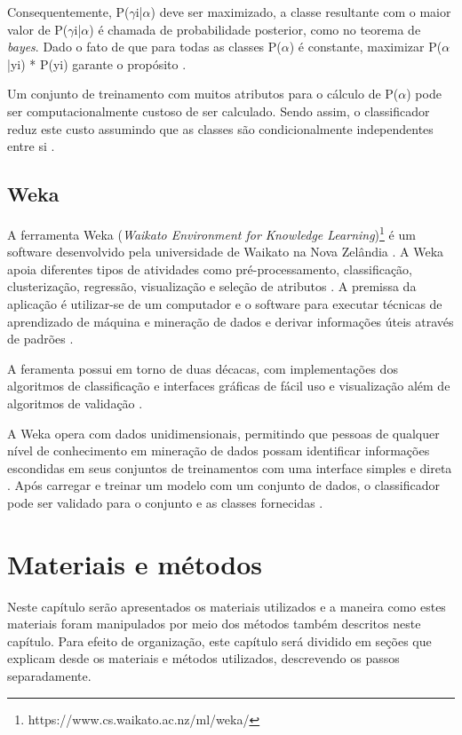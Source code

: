 \documentclass[
	12pt,				%
	oneside,			%
	a4paper,			%
	english,			%
	brazil				%
	]{abntex2ppgsi}
\begin{document}
Consequentemente, P($\gamma$i|$\alpha$)  deve ser maximizado, a classe resultante com o maior valor de P($\gamma$i|$\alpha$)  é chamada de probabilidade posterior, como no teorema de \textit{bayes}. Dado o fato de que para todas as classes P($\alpha$) é constante, maximizar P($\alpha$|yi) * P(yi) garante o propósito \cite{ sharma2015}.

Um conjunto de treinamento com muitos atributos para o cálculo de P($\alpha$) pode ser computacionalmente custoso de ser calculado. Sendo assim, o classificador reduz este custo assumindo que as classes são condicionalmente independentes entre si \cite{ sharma2015}.


\section{Weka}
A ferramenta Weka (\textit{Waikato Environment for Knowledge Learning})\footnote{https://www.cs.waikato.ac.nz/ml/weka/} é um software desenvolvido pela universidade de Waikato na Nova Zelândia \cite{Subbulakshmi2012}.  A Weka apoia diferentes tipos de atividades como pré-processamento, classificação, clusterização, regressão, visualização e seleção de atributos \cite{Subbulakshmi2012}. A premissa da aplicação é utilizar-se de um computador e o software para executar técnicas de aprendizado de máquina e mineração de dados e derivar informações úteis através de padrões \cite{Subbulakshmi2012}.

A feramenta possui em torno de duas décacas, com  implementações dos algoritmos de classificação e interfaces gráficas de fácil uso e visualização além de algoritmos de validação \cite{Bouckaert2008}. 

A Weka opera com dados unidimensionais, permitindo que pessoas de qualquer nível de conhecimento em mineração de dados  possam identificar informações escondidas em seus conjuntos de treinamentos com uma interface simples e direta \cite{Subbulakshmi2012}.  Após carregar e treinar um modelo com um conjunto de dados, o classificador pode ser validado para o conjunto e as classes fornecidas \cite{Subbulakshmi2012}. 

\chapter{Materiais e métodos}
\label{chap:materiais-e-metodos}
Neste capítulo serão apresentados os materiais utilizados e a maneira como estes materiais foram manipulados por meio dos métodos também descritos neste capítulo. Para efeito de organização, este capítulo será dividido em seções que explicam desde os materiais e métodos utilizados, descrevendo os passos separadamente.
\end{document}
